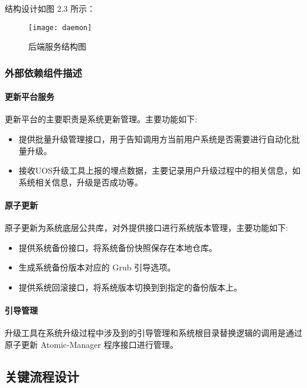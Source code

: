 \documentclass{utart}
\begin{document}
结构设计如图 2.3 所示：
\begin{figure}[H]
    \centering
    \texttt{[image: daemon]}
    \caption{后端服务结构图}
    \label{fig:daemon}
\end{figure}

\subsubsection{外部依赖组件描述}

\paragraph{更新平台服务}
更新平台的主要职责是系统更新管理。主要功能如下:
\begin{itemize}
    \item 提供批量升级管理接口，用于告知调用方当前用户系统是否需要进行自动化批量升级。
    \item 接收UOS升级工具上报的埋点数据，主要记录用户升级过程中的相关信息，如系统相关信息，升级是否成功等。
\end{itemize}

\paragraph{原子更新}
原子更新为系统底层公共库，对外提供接口进行系统版本管理，主要功能如下:
\begin{itemize}
    \item 提供系统备份接口，将系统备份快照保存在本地仓库。
    \item 生成系统备份版本对应的 Grub 引导选项。
    \item 提供系统回滚接口，将系统版本切换到到指定的备份版本上。
\end{itemize}

\paragraph{引导管理}
升级工具在系统升级过程中涉及到的引导管理和系统根目录替换逻辑的调用是通过原子更新 Atomic-Manager 程序接口进行管理。

\subsection{关键流程设计}
\end{document}
